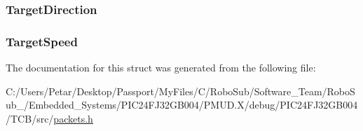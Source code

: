 \subsubsection[{Target\+Direction}]{ Target\+Direction}\label{struct_packet_motor_get_struct_a447585795e8671c8d58ff41eb83e3fa9}
\hypertarget{struct_packet_motor_get_struct_a2aecc325c2f29b441f8a564a5d6db18f}{}
\subsubsection[{Target\+Speed}]{ Target\+Speed}\label{struct_packet_motor_get_struct_a2aecc325c2f29b441f8a564a5d6db18f}


The documentation for this struct was generated from the following file\+:\begin{DoxyCompactItemize}
\item 
C\+:/\+Users/\+Petar/\+Desktop/\+Passport/\+My\+Files/\+C/\+Robo\+Sub/\+Software\+\_\+\+Team/\+Robo\+Sub\+\_/\+Embedded\+\_\+\+Systems/\+P\+I\+C24\+F\+J32\+G\+B004/\+P\+M\+U\+D.\+X/debug/\+P\+I\+C24\+F\+J32\+G\+B004/\+T\+C\+B/src/\hyperlink{_p_m_u_d_8_x_2debug_2_p_i_c24_f_j32_g_b004_2_t_c_b_2src_2packets_8h}{packets.\+h}\end{DoxyCompactItemize}
